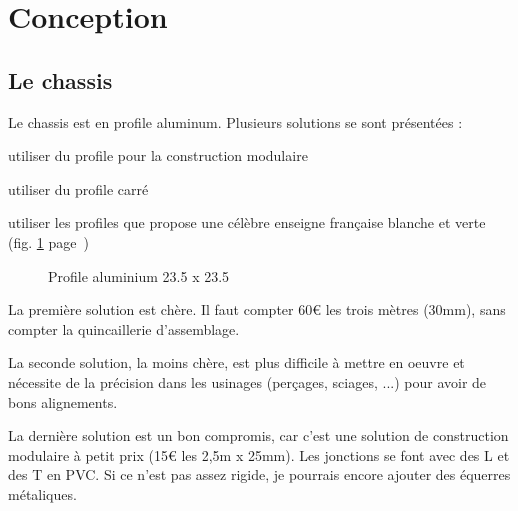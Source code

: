 \section{Conception}
\subsection{Le chassis}
Le chassis est en profile aluminum. Plusieurs solutions se sont %
présentées :\begin{dinglist}{71}%
\item{utiliser du profile pour la construction modulaire}%
\item{utiliser du profile carré}%
\item{utiliser les profiles que propose une célèbre enseigne française %
blanche et verte (fig. \ref{profile} page~\pageref{profile})}
\end{dinglist}%
\par%
\begin{figure}%
   \caption{\label{profile} Profile aluminium 23.5 x 23.5}
\end{figure} %
La première solution est chère. Il faut compter 60\euro{} les trois mètres %
(30mm), sans compter la quincaillerie d'assemblage. \par%
La seconde solution, la moins chère, est plus difficile à mettre en %
oeuvre et nécessite de la précision dans les usinages (perçages, sciages, %
...) pour avoir de bons alignements.\par%
La dernière solution est un bon compromis, car c'est une solution de %
construction modulaire à petit prix (15\euro{} les 2,5m x 25mm). Les jonctions %
se font avec des L et des T en PVC. Si ce n'est pas assez rigide, je %
pourrais encore ajouter des équerres métaliques.
